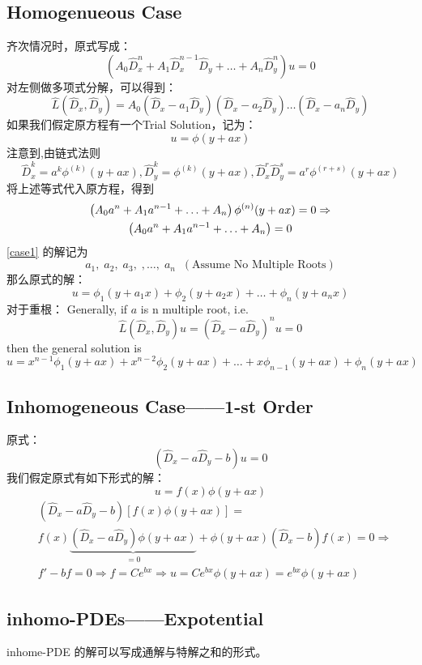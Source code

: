 \documentclass[10pt, a4paper, oneside]{ctexbook}
\begin{document}
\subsection{Homogenueous Case}
齐次情况时，原式写成：
$$
    \left(A_{0} \hat{D}_{x}^{n}+A_{1} \hat{D}_{x}^{n-1} \hat{D}_{y}+\ldots+A_{n} \hat{D}_{y}^{n}\right) u=0
$$
对左侧做多项式分解，可以得到：
$$
    \hat{L}\left(\hat{D}_{x}, \hat{D}_{y}\right)=A_{0}\left(\hat{D}_{x}-a_{1} \hat{D}_{y}\right)\left(\hat{D}_{x}-a_{2} \hat{D}_{y}\right) \ldots\left(\hat{D}_{x}-a_{n} \hat{D}_{y}\right)
$$
如果我们假定原方程有一个Trial Solution，记为：
$$u=\phi (y+ax)$$
注意到,由链式法则
$$
    \hat{D}_{x}^{k}=a^{k} \phi^{(k)}(y+a x), \hat{D}_{y}^{k}=\phi^{(k)}(y+a x), \hat{D}_{x}^{r} \hat{D}_{y}^{s}=a^{r} \phi^{(r+s)}(y+a x)
$$
将上述等式代入原方程，得到
\begin{gather}
    \left(A_{0} a^{n}+A_{1} a^{n-1}+\ldots+A_{n}\right) \phi^{(n)}(y+a x)=0 \Rightarrow \notag \\
    \left(A_{0} a^{n}+A_{1} a^{n-1}+\ldots+A_{n}\right) = 0 \label{case1}
\end{gather}
\ref{case1} 的解记为
$$a_1,\;a_2,\;a_3,\;,\dots,\;a_n \;\;(\text{Assume No Multiple Roots})$$
那么原式的解：
$$
    u=\phi_{1}\left(y+a_{1} x\right)+\phi_{2}\left(y+a_{2} x\right)+\ldots+\phi_{n}\left(y+a_{n} x\right)
$$
对于重根：
Generally, if $a$ is n multiple root, i.e.
$$\hat{L}\left(\hat{D}_{x}, \hat{D}_{y}\right) u=\left(\hat{D}_{x}-a \hat{D}_{y}\right)^{n} u=0$$
then the general solution is
$$
    u=x^{n-1} \phi_{1}(y+a x)+x^{n-2} \phi_{2}(y+a x)+\ldots+x \phi_{n-1}(y+a x)+\phi_{n}(y+a x)
$$
\subsection{Inhomogeneous Case——1-st Order}
原式：
$$
    (\hat{D}_{x}-a\hat{D}_{y}-b)u=0
$$
我们假定原式有如下形式的解：
$$u=f(x)\phi(y+ax)$$
\begin{align*}
     & \left(\hat{D}_{x}-a \hat{D}_{y}-b\right)[f(x) \phi(y+a x)]=                                                                        \\
     & f(x) \underbrace{\left(\hat{D}_{x}-a \hat{D}_{y}\right) \phi(y+a x)}_{=0}+\phi(y+a x)\left(\hat{D}_{x}-b\right) f(x)=0 \Rightarrow \\
     & f'-bf=0 \Rightarrow f=Ce^{bx} \Rightarrow u=Ce^{bx}\phi(y+ax)=e^{bx}\phi(y+ax)
\end{align*}
\subsection{inhomo-PDEs——Expotential}
inhome-PDE 的解可以写成通解与特解之和的形式。
\end{document}
